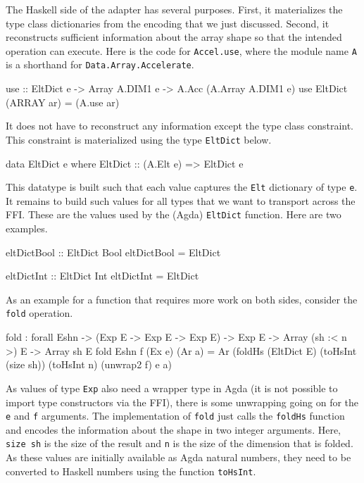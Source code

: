\documentclass{llncs}
\begin{document}
The Haskell side of the adapter has several purposes. First, it
materializes the type class dictionaries from the encoding that we
just discussed. Second, it reconstructs sufficient information about
the array shape so that the intended operation can execute. Here is
the code for \texttt{Accel.use}, where the module name \texttt{A}
is a shorthand for \texttt{Data.Array.Accelerate}.
\begin{hcode}
use :: EltDict e -> Array A.DIM1 e -> A.Acc (A.Array A.DIM1 e)
use EltDict (ARRAY ar) = (A.use ar)
\end{hcode}
It does not have to reconstruct any information except the type class
constraint. This constraint is materialized using the type
\texttt{EltDict} below.
\begin{hcode}
data EltDict e where
  EltDict :: (A.Elt e) => EltDict e
\end{hcode}
This datatype is built such that each value captures the \texttt{Elt}
dictionary of type \texttt{e}. It remains to build such values for all
types that we want to transport across the FFI. These are the values
used by the (Agda) \texttt{EltDict} function. Here are two examples.
\begin{hcode}
eltDictBool :: EltDict Bool
eltDictBool = EltDict

eltDictInt :: EltDict Int
eltDictInt = EltDict
\end{hcode}

As an example for a function that requires more work on both sides,
consider the \texttt{fold} operation. 
\begin{code}
fold : forall {E}{sh}{n}
     -> (Exp E -> Exp E -> Exp E)
     -> Exp E
     -> Array (sh :< n >) E
     -> Array sh E
fold {E}{sh}{n} f (Ex e) (Ar a) =
  Ar (foldHs (EltDict E) (toHsInt (size sh)) (toHsInt n)
             (unwrap2 f) e a)
\end{code}
As values of type \texttt{Exp} also need a wrapper type in Agda (it is
not possible to import type constructors via the FFI), there is some
unwrapping going on for the \texttt{e} and \texttt{f}
arguments. The implementation of \texttt{fold} just calls the
\texttt{foldHs} function and encodes the information about the shape
in two integer arguments. Here, \texttt{size sh} is the size of the
result and \texttt{n} is the size of the dimension that is folded. As
these values are initially available as Agda natural numbers, they need to
be converted to Haskell numbers using the function \texttt{toHsInt}.
\end{document}
